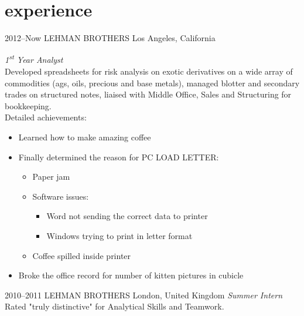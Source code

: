 \documentclass[heros]{friggeri-cv} %
\begin{document}

\section{experience}

\begin{entrylist}
\entry
{2012--Now}
{LEHMAN BROTHERS}
{Los Angeles, California}
{\emph{1\textsuperscript{st} Year Analyst} \\
Developed spreadsheets for risk analysis on exotic derivatives on a wide array of commodities (ags, oils, precious and base metals), managed blotter and secondary trades on structured notes, liaised with Middle Office, Sales and Structuring for bookkeeping. \\
Detailed achievements:
\begin{itemize}
\item Learned how to make amazing coffee
\item Finally determined the reason for \textsc{PC LOAD LETTER}:
\begin{itemize}
\item Paper jam
\item Software issues:
\begin{itemize}
\item Word not sending the correct data to printer
\item Windows trying to print in letter format
\end{itemize}
\item Coffee spilled inside printer
\end{itemize}
\item Broke the office record for number of kitten pictures in cubicle
\end{itemize}}
\entry
{2010--2011}
{LEHMAN BROTHERS}
{London, United Kingdom}
{\emph{Summer Intern} \\
Rated "truly distinctive" for Analytical Skills and Teamwork.}
\end{entrylist}

\end{document}
